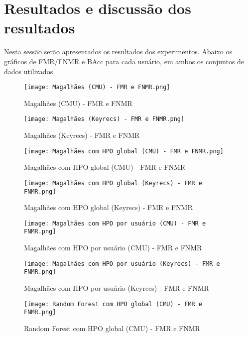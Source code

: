 \section{Resultados e discussão dos resultados}\label{sec:resultados}

Nesta sessão serão apresentados os resultados dos experimentos. Abaixo os gráficos de FMR/FNMR e BAcc para cada usuário, em ambos os conjuntos de dados utilizados.


\begin{figure}[H]
    \caption{Magalhães (CMU) - FMR e FNMR}
    \label{fig:Magalhães (CMU) - FMR e FNMR}
    \centering
    \texttt{[image: Magalhães (CMU) - FMR e FNMR.png]}
\end{figure}
\begin{figure}[H]
    \caption{Magalhães (Keyrecs) - FMR e FNMR}
    \label{fig:Magalhães (Keyrecs) - FMR e FNMR}
    \centering
    \texttt{[image: Magalhães (Keyrecs) - FMR e FNMR.png]}
\end{figure}
\begin{figure}[H]
    \caption{Magalhães com HPO global (CMU) - FMR e FNMR}
    \label{fig:Magalhães com HPO global (CMU) - FMR e FNMR}
    \centering
    \texttt{[image: Magalhães com HPO global (CMU) - FMR e FNMR.png]}
\end{figure}
\begin{figure}[H]
    \caption{Magalhães com HPO global (Keyrecs) - FMR e FNMR}
    \label{fig:Magalhães com HPO global (Keyrecs) - FMR e FNMR}
    \centering
    \texttt{[image: Magalhães com HPO global (Keyrecs) - FMR e FNMR.png]}
\end{figure}
\begin{figure}[H]
    \caption{Magalhães com HPO por usuário (CMU) - FMR e FNMR}
    \label{fig:Magalhães com HPO por usuário (CMU) - FMR e FNMR}
    \centering
    \texttt{[image: Magalhães com HPO por usuário (CMU) - FMR e FNMR.png]}
\end{figure}
\begin{figure}[H]
    \caption{Magalhães com HPO por usuário (Keyrecs) - FMR e FNMR}
    \label{fig:Magalhães com HPO por usuário (Keyrecs) - FMR e FNMR}
    \centering
    \texttt{[image: Magalhães com HPO por usuário (Keyrecs) - FMR e FNMR.png]}
\end{figure}
\begin{figure}[H]
    \caption{Random Forest com HPO global (CMU) - FMR e FNMR}
    \label{fig:Random Forest com HPO global (CMU) - FMR e FNMR}
    \centering
    \texttt{[image: Random Forest com HPO global (CMU) - FMR e FNMR.png]}
\end{figure}
